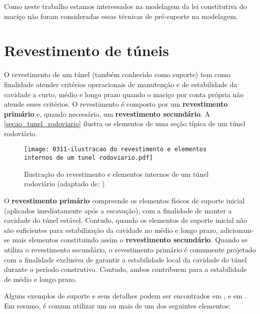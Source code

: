 Como neste trabalho estamos interessados na modelagem da lei constitutiva do maciço não foram consideradas essas técnicas de pré-suporte na modelagem.

\section{Revestimento de túneis}

O revestimento de um túnel (também conhecido como suporte) tem como finalidade atender critérios operacionais de manutenção e de estabilidade da cavidade a curto, médio e longo prazo quando o maciço por conta própria não atende esses critérios. O revestimento é composto por um \textbf{revestimento primário} e, quando necessário, um \textbf{revestimento secundário}. A \autoref{secao_tunel_rodoviario} ilustra os elementos de uma seção típica de um túnel rodoviário.

\begin{figure}[H]
	\begin{center}
		\texttt{[image: 0311-ilustracao do revestimento e elementos internos de um tunel rodoviario.pdf]}
	\end{center}
	\caption{\label{secao_tunel_rodoviario}Ilustração do revestimento e elementos internos de um túnel rodoviário (adaptado de: )}
\end{figure}

O \textbf{revestimento primário} compreende os elementos físicos de suporte inicial (aplicados imediatamente após a escavação), com a finalidade de manter a cavidade do túnel estável. Contudo, quando os elementos de suporte inicial não são suficientes para estabilização da cavidade no médio e longo prazo, adicionam-se mais elementos constituindo assim o \textbf{revestimento secundário}. Quando se utiliza o revestimento secundário, o revestimento primário é comumente projetado com a finalidade exclusiva de garantir a estabilidade local da cavidade do túnel durante o período construtivo. Contudo, ambos contribuem para a estabilidade de médio e longo prazo. 

Alguns exemplos de suporte e seus detalhes podem ser encontrados em ,  e em . Em resumo, é comum utilizar um ou mais de um dos seguintes elementos:

